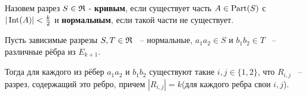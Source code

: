 







\begin{df*}
	Назовем разрез $S \in \mathfrak{R}$ - \textbf{кривым}, если существует часть  $A \in \operatorname{Part}(S)$ с  $|\operatorname{Int}(A)| < \frac k 2$ и  \textbf{нормальным}, если такой части не существует.
\end{df*}

\begin{customlm}{3.4} \label{lemma:3_4}
	Пусть зависимые разрезы $S, T \in \mathfrak{R}$ ~-- нормальные,  $a_1a_2 \in S$ и $b_1 b_2 \in T$ ~-- различные рёбра из $E_{k + 1}$.

	Тогда для каждого из рёбер  $a_1a_2$ и $b_1b_2$ существуют такие $i, j \in \{1, 2\}$, что  $R_{i, j}$ ~-- разрез, содержащий это ребро, причем  $|R_{i, j}| = k$(для каждого ребра свои $i, j$).
\end{customlm}


